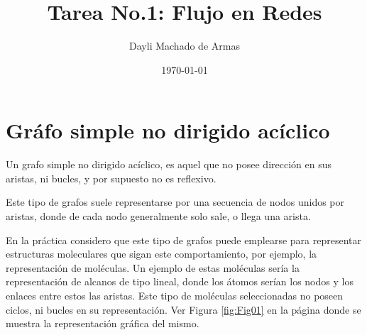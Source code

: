 \documentclass{article}
\begin{document}
\title{Tarea No.1: Flujo en Redes}
\author{Dayli Machado de Armas}
\date{\today}
\maketitle

\section{Gráfo simple no dirigido acíclico}

Un grafo simple no dirigido acíclico, es aquel que no posee dirección en sus aristas, ni bucles, y por supuesto no es reflexivo.\cite{codimag}

Este tipo de grafos suele representarse por una secuencia de nodos unidos por aristas, donde de cada nodo generalmente solo sale, o llega una arista.\cite{Net} 

En la práctica considero que este tipo de grafos puede emplearse para representar estructuras moleculares que sigan este comportamiento, por ejemplo, la representación de moléculas. Un ejemplo de estas moléculas sería la representación de alcanos de tipo lineal, donde los átomos serían los nodos y los enlaces entre estos las aristas. Este tipo de moléculas seleccionadas no poseen ciclos, ni bucles en su representación.  Ver Figura \ref{fig:Fig01} en la página \pageref{fig:Fig01} donde se muestra la representación gráfica del mismo. 


\end{document}
